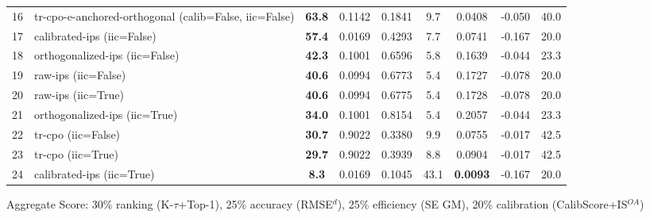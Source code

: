 \begin{table}[htbp]
\begin{tabular}{cl|c|cccccc}
16 & tr-cpo-e-anchored-orthogonal (calib=False, iic=False) & \textbf{63.8} & 0.1142 & 0.1841 & 9.7 & 0.0408 & -0.050 & 40.0 \\
17 & calibrated-ips (iic=False) & \textbf{57.4} & 0.0169 & 0.4293 & 7.7 & 0.0741 & -0.167 & 20.0 \\
18 & orthogonalized-ips (iic=False) & \textbf{42.3} & 0.1001 & 0.6596 & 5.8 & 0.1639 & -0.044 & 23.3 \\
19 & raw-ips (iic=False) & \textbf{40.6} & 0.0994 & 0.6773 & 5.4 & 0.1727 & -0.078 & 20.0 \\
20 & raw-ips (iic=True) & \textbf{40.6} & 0.0994 & 0.6775 & 5.4 & 0.1728 & -0.078 & 20.0 \\
21 & orthogonalized-ips (iic=True) & \textbf{34.0} & 0.1001 & 0.8154 & 5.4 & 0.2057 & -0.044 & 23.3 \\
22 & tr-cpo (iic=False) & \textbf{30.7} & 0.9022 & 0.3380 & 9.9 & 0.0755 & -0.017 & 42.5 \\
23 & tr-cpo (iic=True) & \textbf{29.7} & 0.9022 & 0.3939 & 8.8 & 0.0904 & -0.017 & 42.5 \\
24 & calibrated-ips (iic=True) & \textbf{8.3} & 0.0169 & 0.1045 & 43.1 & \textbf{0.0093} & -0.167 & 20.0 \\
\bottomrule
\end{tabular}
\footnotesize{Aggregate Score: 30\% ranking (K-$\tau$+Top-1), 25\% accuracy (RMSE$^d$), 25\% efficiency (SE GM), 20\% calibration (CalibScore+IS$^{OA}$)}
\end{table}
